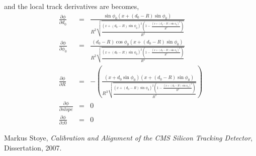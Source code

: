 \documentclass{article}
\def\partder#1#2{\ensuremath{\frac{\partial #1}{\partial #2}}}
\begin{document}
and the local track derivatives are becomes,
\begin{eqnarray}
\partder{\phi}{d_0} &=&  \frac{\sin\phi_0 \left(x + \left(d_0 - R\right) \sin\phi_0\right)}{R^2 \sqrt{\frac{\left(x + \left(d_0 - R\right) \sin\phi_0\right)^2 \left(1 - \frac{\left(x + (d_0 - R) \sin\phi_0\right)^2}{R^2}\right)}{R^2}}} \nonumber  \\
\partder{\phi}{\phi_0} &=&\frac{\left(d_0 - R\right) \cos\phi_0 \left(x + \left(d_0 - R\right) \sin\phi_0\right)} { R^2 \sqrt{ \frac{\left(x + \left(d_0 - R\right) \sin\phi_0\right)^2 \left(1 - \frac{\left(x + \left(d_0 - R\right) \sin\phi_0\right)^2}{R^2}\right)}{R^2}}} \nonumber  \\
\partder{\phi}{R} &=& -\left( \frac{ \left(x + d_0 \sin\phi_0\right) \left(x + \left(d_0 - R\right) \sin\phi_0\right)}{ R^3 \sqrt{ \frac{ \left(x + \left(d_0 - R\right) \sin\phi_0\right)^2 \left(1 - \frac{ \left(x + \left(d_0 - R\right) \sin\phi_0\right)^2}{R^2}\right)}{R^2}}} \right) \nonumber \\
\partder{\phi}{slope} &=& 0 \nonumber \\
\partder{\phi}{z0} &=& 0
\end{eqnarray}






\begin{thebibliography}{9}

Markus Stoye, 
\emph{Calibration and Alignment of the CMS Silicon Tracking Detector},
Dissertation,
2007.

\end{thebibliography}
\end{document}
